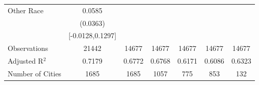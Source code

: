 \documentclass{article}
\begin{document}
\begin{table}[htbp]
\begin{tabular}{l*{6}{c}}
Other Race          &      0.0585   &               &               &               &               &               \\
                    &    (0.0363)   &               &               &               &               &               \\
                    &[-0.0128,0.1297]   &               &               &               &               &               \\
\midrule
Observations        &       21442   &       14677   &       14677   &       14677   &       14677   &       14677   \\
Adjusted R$^2$      &      0.7179   &      0.6772   &      0.6768   &      0.6171   &      0.6086   &      0.6323   \\
Number of Cities    &        1685   &        1685   &        1057   &         775   &         853   &         132   \\
\bottomrule
\end{tabular}
\end{table}
\end{document}
